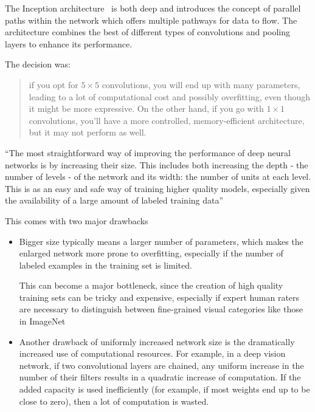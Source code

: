 \documentclass[11pt]{article}
\begin{document}
The Inception architecture~\cite{Inception} is both deep and introduces the concept of parallel paths within the network which offers multiple pathways for data to flow. The architecture combines the best of different types of convolutions and pooling layers to enhance its performance.

The decision was:

\begin{quote}
    if you opt for $ 5\times5$ convolutions, you will end up with many parameters, leading to a lot of computational cost and possibly overfitting, even though it might be more expressive. On the other hand, if you go with $ 1\times1$ convolutions, you'll have a more controlled, memory-efficient architecture, but it may not perform as well.
\end{quote}

``The most straightforward way of improving the performance of deep neural networks is by increasing their size. This includes both increasing the depth - the number of levels - of the network and its width: the number of units at each level. This is as an easy and safe way of training higher quality models, especially given the availability of a large amount of labeled training data''~\cite{Inception}


This comes with two major drawbacks
\begin{itemize}
    \item Bigger size typically means a larger number of parameters, which makes the enlarged network more prone to overfitting, especially if the number of labeled examples in the training set is limited. 
    
    This can become a major bottleneck, since the creation of high quality training sets can be tricky and expensive, especially if expert human raters are necessary to distinguish between fine-grained visual categories like those in ImageNet
    \item Another drawback of uniformly increased network size is the dramatically increased use of computational resources. For example, in a deep vision network, if two convolutional layers are chained, any uniform increase in the number of their filters results in a quadratic increase of computation. If the added capacity is used inefficiently (for example, if most weights end up to be close to zero), then a lot of computation is wasted.
\end{itemize}
\end{document}
